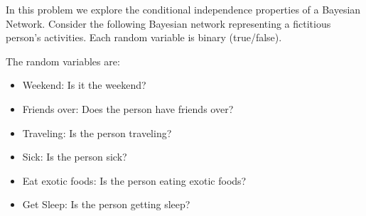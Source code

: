 \documentclass[submit]{harvardml}
\newcommand{\attr}[1]{\textsf{#1}}
\begin{document}
\begin{problem}

% 
% 

  
  \noindent In this problem we explore the conditional independence
  properties of a Bayesian Network.  Consider the following Bayesian
  network representing a fictitious person's activities. Each random
  variable is binary (true/false).

\begin{center}
\end{center}

The random variables are:

\begin{itemize}
\item \attr{Weekend}: Is it the weekend?
\item \attr{Friends over}: Does the person have friends over?
\item \attr{Traveling}: Is the person traveling?
\item \attr{Sick}: Is the person sick?
\item \attr{Eat exotic foods}: Is the person eating exotic foods?
\item \attr{Get Sleep}: Is the person getting sleep?
\end{itemize}


\end{problem}
\end{document}
